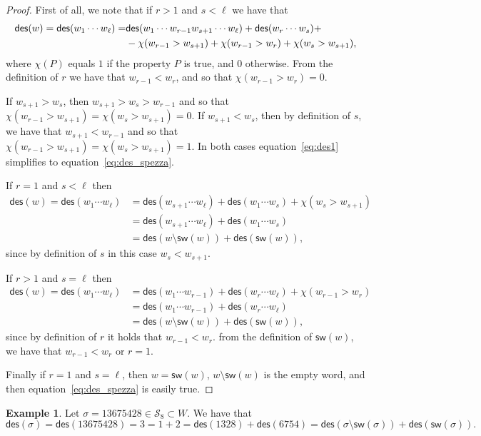 \documentclass[a4paper]{amsart}
\newcommand{\des}{\mathsf{des}}
\newcommand{\sw}{\mathsf{sw}}
\theoremstyle{definition}
\newtheorem{example}[theorem]{Example}
\theoremstyle{remark}
\numberwithin{equation}{section}
\begin{document}
\begin{proof}
First of all, we note that if $r>1$ and $s<\ell$ we have that
\begin{align}
    \des(w)=\des(w_1\cdots w_{\ell})= &\des(w_1\cdots w_{r-1}w_{s+1}\cdots w_{\ell})+\des(w_r\cdots w_s)+\label{eq:des1}\\&-\chi(w_{r-1}>w_{s+1})+\chi(w_{r-1}>w_{r})+\chi(w_{s}>w_{s+1}),\notag
\end{align}
where $\chi(P)$ equals $1$ if the property $P$ is true, and $0$ otherwise.
From the definition of $r$ we have that $w_{r-1}<w_r$, and so that $\chi(w_{r-1}>w_{r})=0$.

If $w_{s+1}>w_{s}$, then $w_{s+1}>w_{s}>w_{r-1}$ and so that $\chi(w_{r-1}>w_{s+1})=\chi(w_{s}>w_{s+1})=0$.
If $w_{s+1}<w_{s}$, then by definition of $s$, we have that $w_{s+1}<w_{r-1}$ and so that $\chi(w_{r-1}>w_{s+1})=\chi(w_{s}>w_{s+1})=1$. In both cases equation~\eqref{eq:des1} simplifies to equation~\eqref{eq:des_spezza}.

If $r=1$ and $s<\ell$ then
\begin{align*}
    \des(w)=\des(w_1\cdots w_{\ell})&=\des(w_{s+1}\cdots w_{\ell})+\des(w_1\cdots w_s)+\chi(w_{s}>w_{s+1})\\
    &=\des(w_{s+1}\cdots w_{\ell})+\des(w_1\cdots w_s)\\
    &=\des(w\setminus\sw(w))+\des(\sw(w)),
\end{align*}
since by definition of $s$ in this case $w_s<w_{s+1}.$

If $r>1$ and $s=\ell$ then
\begin{align*}
    \des(w)=\des(w_1\cdots w_{\ell})&=\des(w_{1}\cdots w_{r-1})+\des(w_r\cdots w_{\ell})+\chi(w_{r-1}>w_{r})\\
    &=\des(w_{1}\cdots w_{r-1})+\des(w_r\cdots w_{\ell})\\
    &=\des(w\setminus\sw(w))+\des(\sw(w)),
\end{align*}
since by definition of $r$ it holds that $w_{r-1}<w_{r}.$
from the definition of $\sw(w)$, we have that $w_{r-1}<w_{r}$ or $r=1$. 

Finally if $r=1$ and $s=\ell$, then $w=\sw(w)$, $w\setminus\sw(w)$ is the empty word, and then equation~\eqref{eq:des_spezza} is easily true.
\end{proof}

\begin{example}
    Let $\sigma=13675428\in \mathcal{S}_8\subset W$. We have that $$\des(\sigma)=\des(13675428)=3=1+2=\des(1328)+\des(6754)=\des(\sigma\setminus\sw(\sigma))+\des(\sw(\sigma)).$$
\end{example}
\end{document}
